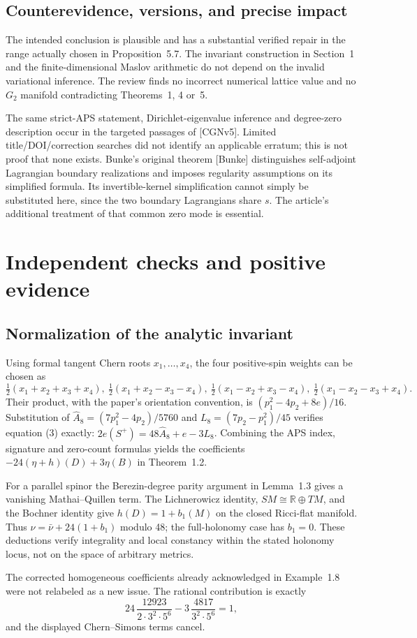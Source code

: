 \documentclass[10pt]{article}
\begin{document}
\subsection*{Counterevidence, versions, and precise impact}
The intended conclusion is plausible and has a substantial verified repair in the range actually chosen in Proposition 5.7. The invariant construction in Section 1 and the finite-dimensional Maslov arithmetic do not depend on the invalid variational inference. The review finds no incorrect numerical lattice value and no \(G_2\) manifold contradicting Theorems 1, 4 or 5.\par
The same strict-APS statement, Dirichlet-eigenvalue inference and degree-zero description occur in the targeted passages of [CGNv5]. Limited title/DOI/correction searches did not identify an applicable erratum; this is not proof that none exists. Bunke’s original theorem [Bunke] distinguishes self-adjoint Lagrangian boundary realizations and imposes regularity assumptions on its simplified formula. Its invertible-kernel simplification cannot simply be substituted here, since the two boundary Lagrangians share \(s\). The article’s additional treatment of that common zero mode is essential.\par
\section*{Independent checks and positive evidence}
\subsection*{Normalization of the analytic invariant}
Using formal tangent Chern roots \(x_1,\ldots,x_4\), the four positive-spin weights can be chosen as \[\tfrac12(x_1+x_2+x_3+x_4),\
 \tfrac12(x_1+x_2-x_3-x_4),\
 \tfrac12(x_1-x_2+x_3-x_4),\
 \tfrac12(x_1-x_2-x_3+x_4).\] Their product, with the paper’s orientation convention, is \((p_1^2-4p_2+8e)/16\). Substitution of \(\widehat A_8=(7p_1^2-4p_2)/5760\) and \(L_8=(7p_2-p_1^2)/45\) verifies equation (3) exactly: \(2e(S^+)=48\widehat A_8+e-3L_8\). Combining the APS index, signature and zero-count formulas yields the coefficients \(-24(\eta+h)(D)+3\eta(B)\) in Theorem 1.2.\par
For a parallel spinor the Berezin-degree parity argument in Lemma 1.3 gives a vanishing Mathai–Quillen term. The Lichnerowicz identity, \(SM\cong\mathbb R\oplus TM\), and the Bochner identity give \(h(D)=1+b_1(M)\) on the closed Ricci-flat manifold. Thus \(\nu=\bar\nu+24(1+b_1)\) modulo 48; the full-holonomy case has \(b_1=0\). These deductions verify integrality and local constancy within the stated holonomy locus, not on the space of arbitrary metrics.\par
The corrected homogeneous coefficients already acknowledged in Example 1.8 were not relabeled as a new issue. The rational contribution is exactly \[24\,\frac{12923}{2\cdot3^2\cdot5^6}
 -3\,\frac{4817}{3^2\cdot5^6}=1,\] and the displayed Chern–Simons terms cancel.\par
\end{document}
